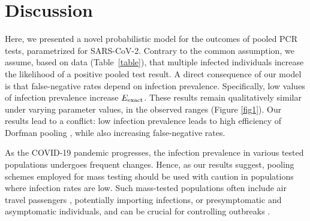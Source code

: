 \documentclass{article}
\begin{document}
\section*{Discussion}
Here, we presented a novel probabilistic model for the outcomes of
pooled PCR tests, parametrized for SARS-CoV-2. Contrary to the common
assumption, we assume, based on data (Table~\ref{table}), that multiple
infected individuals increase the likelihood of a positive pooled test
result. A direct consequence of our model is that false-negative rates
depend on infection prevalence. Specifically, low values of infection
prevalence increase $E_{\text{{exact}}}$. These results remain qualitatively
similar under varying parameter values, in the observed ranges
\cite{KitComparison,EstimatingRatesKucrika, EstimatingRatesLourenco,
  InterpretingCOVID19Test} (Figure \ref{fig1}).
Our results lead to a conflict: low infection prevalence leads to high
efficiency of Dorfman pooling \cite{DorfmanYuvalDor}, while also
increasing false-negative rates. 

As the COVID-19 pandemic progresses, the infection prevalence
in various tested populations undergoes frequent changes. Hence, as
our results suggest, pooling schemes employed for mass testing should be
used with caution in populations where infection rates are low. Such
mass-tested populations often include air travel passengers
\cite{JTM,RobinHood}, potentially importing infections, or
presymptomatic and asymptomatic individuals, and can be crucial for
controlling outbreaks \cite{MinaScience}.

\end{document}
